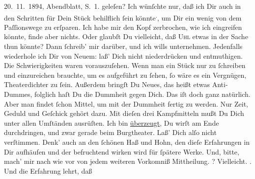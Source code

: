 \begin{ledgroupsized}[t]{13cm}
{{{                        20. 11. 1894, Abendblatt, S. 1. }}}\label{K_L02622_5h} geleſen?\pend
           \pstart
           Ich wünſchte nur, daß ich Dir auch in den Schritten für Dein Stück behilflich ſein könnte\substVorne{}\textsuperscript{.}\substDazwischen{},\substHinten{} um Dir ein wenig von dem Paſſionswege zu erſparen. Ich habe mir den Kopf
               zerbrochen, wie ich eingreifen könnte, finde aber nichts. Oder glaubſt Du vielleicht,
               daß {\pb}\textsc{Uhl} etwas in der Sache thun könnte? Dann ſchreib’ mir darüber, und ich wills
               unternehmen. Jedenfalls wiederhole ich Dir von Neuem: laß’ Dich nicht niederdrücken
               und entmuthigen. Die Schwierigkeiten waren vorauszuſehen. Wenn man ein Stück nur zu
               ſchreiben und einzureichen brauchte, um es aufgeführt zu ſehen, ſo wäre es ein
               Vergnügen, Theaterdichter zu ſein. Außerdem bringſt Du Neues, das heißt etwas
               Anti-Dummes, folglich haſt Du die Dummheit gegen Dich. Das iſt doch ganz natürlich.
               Aber man findet ſchon Mittel, {\pb}um mit der Dummheit
               fertig zu werden. Nur Zeit, Geduld und Geſchick gehört dazu. Mit dieſen drei
               Kampfmitteln \strikeout{\textcolor{gray}{we}} mußt Du Dich unter allen Umſtänden ausrüſten. Ich bin \uline{überzeugt}, Du wirſt am Ende durchdringen, und zwar gerade beim Burgtheater. Laß’ Dich alſo nicht verſtimmen.
               Denk’ auch an den ſchönen Haß und Hohn, den dieſe Erfahrungen in Dir aufhäufen und
               der befruchtend wirken wird für  ſpätere Werke.
               Und, bitte, mach’ mir nach wie vor von jedem weiteren Vorkomniß Mittheilung. \label{K_L02622_6v}\label{K_L02622_6h}? {\pb}Vielleicht. \label{K_L02622_7v}\label{K_L02622_7h}. Und die Erfahrung lehrt, daß

\end{ledgroupsized}
